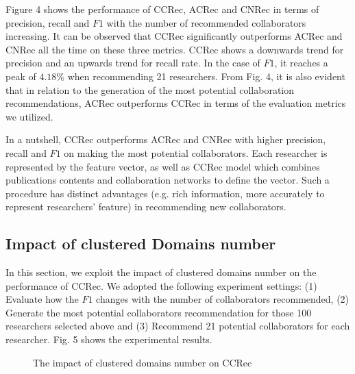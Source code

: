 \documentclass[review]{elsarticle}
\begin{document}
Figure 4 shows the performance of CCRec, ACRec and CNRec in terms of precision, recall and $F1$ with the number of recommended collaborators increasing. It can be observed that CCRec significantly outperforms ACRec and CNRec all the time on these three metrics. CCRec shows a downwards trend for precision and an upwards trend for recall rate. In the case of $F1$, it reaches a peak of $4.18\%$ when recommending 21 researchers. From Fig. 4, it is also evident that in relation to the generation of the most potential collaboration recommendations, ACRec outperforms CCRec in terms of the evaluation metrics we utilized.

In a nutshell, CCRec outperforms ACRec and CNRec with higher precision, recall and $F1$ on making the most potential collaborators. Each researcher is represented by the feature vector, as well as CCRec model which combines publications contents and collaboration networks to define the vector. Such a procedure has distinct advantages (e.g. rich information, more accurately to represent researchers' feature) in recommending new collaborators.

\subsection{Impact of clustered Domains number}
In this section, we exploit the impact of clustered domains number on the performance of CCRec. We adopted the following experiment settings: (1) Evaluate how the $F1$ changes with the number of collaborators recommended, (2) Generate the most potential collaborators recommendation for those 100 researchers selected above and (3) Recommend 21 potential collaborators for each researcher. Fig. 5 shows the experimental results.

\begin{figure}
\centering
{}
\caption{The impact of clustered domains number on CCRec}
\label{fig:5}
\end{figure}
\end{document}
